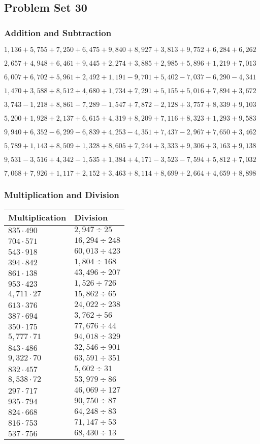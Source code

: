 \hypertarget{problem-set-30-3}{%
\subsection{Problem Set 30}\label{problem-set-30-3}}

\hypertarget{addition-and-subtraction-192}{%
\subsubsection{Addition and
Subtraction}\label{addition-and-subtraction-192}}

\(1,136+5,755+7,250+6,475+9,840+8,927+3,813+9,752+6,284+ 6,262\)

\(2,657+4,948+6,461+9,445+2,274+3,885+2,985+5,896+1,219+7,013\)

\(6,007+6,702+5,961+2,492+1,191-9,701+5,402-7,037-6,290-4,341\)

\(1,470+3,588+8,512+4,680+1,734+7,291+5,155+5,016+7,894+3,672\)

\(3,743-1,218+8,861-7,289-1,547+7,872-2,128+3,757+8,339+9,103\)

\(5,200+1,928+2,137+6,615+4,319+8,209+7,116+8,323+1,293+9,583\)

\(9,940+6,352-6,299-6,839+4,253-4,351+7,437-2,967+7,650+3,462\)

\(5,789+1,143+8,509+1,328+8,605+7,244+3,333+9,306+3,163+9,138\)

\(9,531-3,516+4,342-1,535+1,384+4,171-3,523-7,594+5,812+7,032\)

\(7,068+7,926+1,117+2,152+3,463+8,114+8,699+2,664+4,659+8,898\)

\hypertarget{multiplication-and-division-191}{%
\subsubsection{Multiplication and
Division}\label{multiplication-and-division-191}}

\begin{longtable}[]{@{}ll@{}}
\toprule
Multiplication & Division\tabularnewline
\midrule
\endhead
\(835\cdot490\) & \(2,947÷25\)\tabularnewline
\(704\cdot571\) & \(16,294÷248\)\tabularnewline
\(543\cdot918\) & \(60,013÷423\)\tabularnewline
\(394\cdot842\) & \(1,804÷168\)\tabularnewline
\(861\cdot138\) & \(43,496÷207\)\tabularnewline
\(953\cdot423\) & \(1,526÷726\)\tabularnewline
\(4,711\cdot27\) & \(15,862÷65\)\tabularnewline
\(613\cdot376\) & \(24,022÷238\)\tabularnewline
\(387\cdot694\) & \(3,762÷56\)\tabularnewline
\(350\cdot175\) & \(77,676÷44\)\tabularnewline
\(5,777\cdot71\) & \(94,018÷329\)\tabularnewline
\(843\cdot486\) & \(32,546÷901\)\tabularnewline
\(9,322\cdot70\) & \(63,591÷351\)\tabularnewline
\(832\cdot457\) & \(5,602÷31\)\tabularnewline
\(8,538\cdot72\) & \(53,979÷86\)\tabularnewline
\(297\cdot717\) & \(46,069÷127\)\tabularnewline
\(935\cdot794\) & \(90,750÷87\)\tabularnewline
\(824\cdot668\) & \(64,248÷83\)\tabularnewline
\(816\cdot753\) & \(71,147÷53\)\tabularnewline
\(537\cdot756\) & \(68,430÷13\)\tabularnewline
\bottomrule
\end{longtable}

